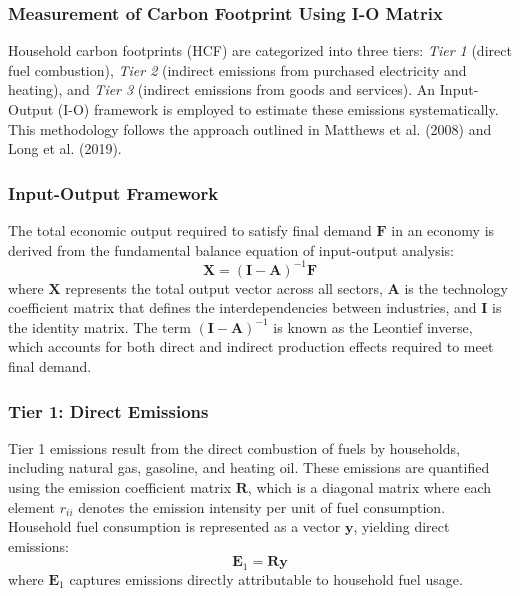 \documentclass[12pt,a4paper]{article}%
\begin{document}
\subsubsection*{Measurement of Carbon Footprint Using I-O Matrix}

Household carbon footprints (HCF) are categorized into three tiers: \textit{Tier 1} (direct fuel combustion), \textit{Tier 2} (indirect emissions from purchased electricity and heating), and \textit{Tier 3} (indirect emissions from goods and services). An Input-Output (I-O) framework is employed to estimate these emissions systematically. This methodology follows the approach outlined in Matthews et al. (2008) and Long et al. (2019).

\subsubsection*{Input-Output Framework}
The total economic output required to satisfy final demand \( \mathbf{F} \) in an economy is derived from the fundamental balance equation of input-output analysis:
\begin{equation}
    \mathbf{X} = {(\mathbf{I} - \mathbf{A})}^{-1} \mathbf{F}
\end{equation}
where \( \mathbf{X} \) represents the total output vector across all sectors, \( \mathbf{A} \) is the technology coefficient matrix that defines the interdependencies between industries, and \( \mathbf{I} \) is the identity matrix. The term \( {(\mathbf{I} - \mathbf{A})}^{-1} \) is known as the Leontief inverse, which accounts for both direct and indirect production effects required to meet final demand.

\subsubsection*{Tier 1: Direct Emissions}
Tier 1 emissions result from the direct combustion of fuels by households, including natural gas, gasoline, and heating oil. These emissions are quantified using the emission coefficient matrix \( \mathbf{R} \), which is a diagonal matrix where each element \( r_{ii} \) denotes the emission intensity per unit of fuel consumption. Household fuel consumption is represented as a vector \( \mathbf{y} \), yielding direct emissions:
\begin{equation}
    \mathbf{E}_1 = \mathbf{R} \mathbf{y}
\end{equation}
where \( \mathbf{E}_1 \) captures emissions directly attributable to household fuel usage.
\end{document}

